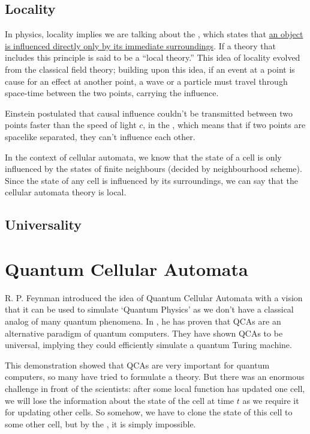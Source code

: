 \documentclass[11pt, oneside, listof=totoc]{scrbook}
\begin{document}
\subsection{Locality} \label{ssec: locality}

In physics, locality implies we are talking about the , which states that \uline{an object is influenced directly only by its immediate surroundings}. If a theory that includes this principle is said to be a ``local theory.'' This idea of locality evolved from the classical field theory; building upon this idea, if an event at a point is cause for an effect at another point, a wave or a particle must travel through space-time between the two points, carrying the influence.

Einstein postulated that causal influence couldn't be transmitted between two points faster than the speed of light \(c\), in the , which means that if two points are spacelike separated, they can't influence each other. %

In the context of cellular automata, we know that the state of a cell is only influenced by the states of finite neighbours (decided by neighbourhood scheme). Since the state of any cell is influenced by its surroundings, we can say that the cellular automata theory is local.
\subsection{Universality} \label{ssec: universality}

\section{Quantum Cellular Automata}
R. P. Feynman introduced the idea of Quantum Cellular Automata with a vision that it can be used to simulate `Quantum Physics' as we don't have a classical analog of many quantum phenomena. In \cite{Watrous1995}, he has proven that QCAs are an alternative paradigm of quantum computers. They have shown QCAs to be universal, implying they could efficiently simulate a quantum Turing machine.

This demonstration showed that QCAs are very important for quantum computers, so many have tried to formulate a theory. But there was an enormous challenge in front of the scientists: after some local function has updated one cell, we will lose the information about the state of the cell at time \(t\) as we require it for updating other cells. So somehow, we have to clone the state of this cell to some other cell, but by the , it is simply impossible.
\end{document}
